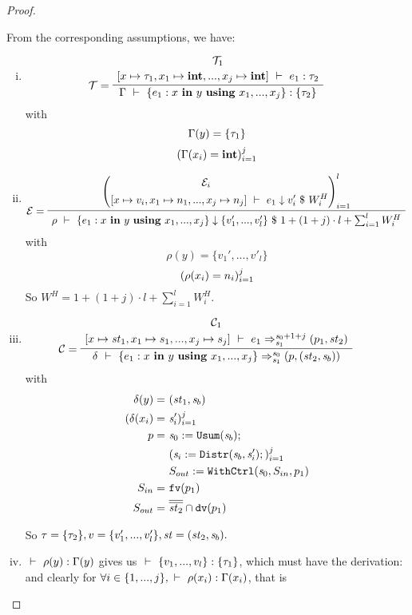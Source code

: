 \begin{proof}
\begin{itemize}
From the corresponding assumptions, we have: 
		\begin{enumerate}[(i)]
		\item 
		$$\PT{
			\UCN{\MT_1}{\Type{ [x \|-> {\tau_1}, x_1 \|-> \int,...,x_j \|-> \int ]}{e_1}{\tau_2}}
			\LeLa{\MT = }
			\UC{\Type{\Gam}{\Comp{e_1}{x}{y}{\usevars}}{\tseq{\tau_2}}}
		} $$
	    with $$\Gamma(y)=\{\tau_1\}$$
	        $$(\Gamma(x_i) = \mathbf{int})^j_{i=1}$$
		
		\item
		\[\PT{
			\AC{\left(
				\begin{aligned}
					&\ME_i \\
					\Eval{[x \|-> {v_i}, x_1 \|-> n_1,...& , x_j \|-> n_j]}{e_1}{v_i'}{W^H_i}
				\end{aligned}\right)^l_{i=1}}
			\LeLa{\ME = }
			\UC{\Eval{\rho}{\Comp{e_1}{x}{y}{\usevars}}{\{v_1',...,v'_l\}}
			      { 1+ (1+ j) \cdot l + \sum_{i=1}^{l}W^H_i }}
		}\]
	    with $$\rho(y)=\{v_1',...,v'_l\} $$
	    \[(\rho(x_i) = n_i)^j_{i=1}\]
		So $W^H = 1 + (1+ j) \cdot l + \sum_{i=1}^{l}W^H_i $.
		
		\item 
		\[\PT{
			\UCN{\MC_1}{\Trans{[x \|-> {\st_1}, x_1 \|-> s_1,...,x_j \|-> s_j]}{e_1}{\s_0+1+j}{\s_1}{\sfun{p_1}{\st_2}}}
			\LeLa{\MC = }
			\UC{\Trans{\del}{\Comp{e_1}{x}{y}{\usevars}}{\s_0}{\s_1}
				{\sfun{p}{(\st_2,\s_b)}}}
		}\]
	    with
	    	\begin{align*}
	    		\delta(y) = &  \ (\mathit{st}_1,\mathit{s}_b) \\
	    		(\delta(x_i) = & \ \mathit{s}_i')^j_{i=1} \\
	    		p = & \ \mathit{s}_0 := \mathtt{Usum}(\mathit{s}_b); \\
	    		& \ (\mathit{s}_i := \mathtt{Distr}(\mathit{s}_b,\mathit{s}_i');)^j_{i=1} \\
	    		& \ S_{out} := \mathtt{WithCtrl}(\mathit{s}_0,S_{in},p_1) \\
	    		S_{in} = &  \ \mathtt{fv}(p_1) \\
	    		S_{out} = & \ \overline{\overline{\mathit{st}_2}} \cap \mathtt{dv}(p_1) 
	    	\end{align*}
	
	 So $\tau = \{\tau_2\}, v = \{ v'_1,...,v'_l \}, \mathit{st} = (\mathit{st}_2,\mathit{s}_b). $ \\

	\item $\ \vdash\  \rho(y) : \Gamma(y)$ gives us $\ \vdash\  \{ v_1,...,v_l \} : \{\tau_1\}$, 
	which must have the derivation:
	and clearly for $\forall i \in \{1,...,j\}, \ \vdash\  \rho(x_i) : \Gamma(x_i)$, that is 
	

\end{enumerate}
\end{itemize}
\end{proof}
